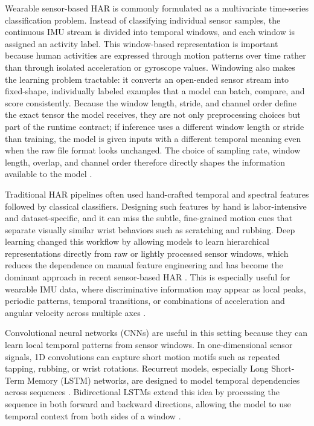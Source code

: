 Wearable sensor-based HAR is commonly formulated as a multivariate time-series classification problem. Instead of classifying individual sensor samples, the continuous IMU stream is divided into temporal windows, and each window is assigned an activity label. This window-based representation is important because human activities are expressed through motion patterns over time rather than through isolated acceleration or gyroscope values. Windowing also makes the learning problem tractable: it converts an open-ended sensor stream into fixed-shape, individually labeled examples that a model can batch, compare, and score consistently. Because the window length, stride, and channel order define the exact tensor the model receives, they are not only preprocessing choices but part of the runtime contract; if inference uses a different window length or stride than training, the model is given inputs with a different temporal meaning even when the raw file format looks unchanged. The choice of sampling rate, window length, overlap, and channel order therefore directly shapes the information available to the model \cite{lara2013survey,bulling2014tutorial,bao2004activity}.

Traditional HAR pipelines often used hand-crafted temporal and spectral features followed by classical classifiers. Designing such features by hand is labor-intensive and dataset-specific, and it can miss the subtle, fine-grained motion cues that separate visually similar wrist behaviors such as scratching and rubbing. Deep learning changed this workflow by allowing models to learn hierarchical representations directly from raw or lightly processed sensor windows, which reduces the dependence on manual feature engineering and has become the dominant approach in recent sensor-based HAR \cite{ordonez2016deep,hammerla2016deep}. This is especially useful for wearable IMU data, where discriminative information may appear as local peaks, periodic patterns, temporal transitions, or combinations of acceleration and angular velocity across multiple axes \cite{wang2019sensorhar,zhang2022wearablehar,oleh2024harreview}.

Convolutional neural networks (CNNs) are useful in this setting because they can learn local temporal patterns from sensor windows. In one-dimensional sensor signals, 1D convolutions can capture short motion motifs such as repeated tapping, rubbing, or wrist rotations. Recurrent models, especially Long Short-Term Memory (LSTM) networks, are designed to model temporal dependencies across sequences \cite{hochreiter1997lstm}. Bidirectional LSTMs extend this idea by processing the sequence in both forward and backward directions, allowing the model to use temporal context from both sides of a window \cite{schuster1997bilstm}.

